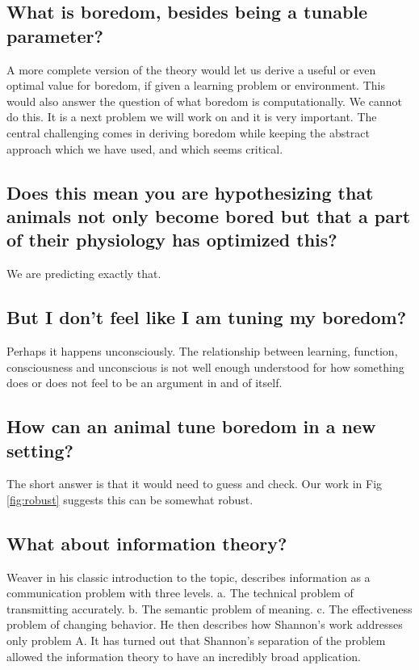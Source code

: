 \subsection*{What is boredom, besides being a tunable parameter?}
A more complete version of the theory would let us derive a useful or even optimal value for boredom, if given a learning problem or environment. This would also answer the question of what boredom is computationally. We cannot do this. It is a next problem we will work on and it is very important. The central challenging comes in deriving boredom while keeping the abstract approach which we have used, and which seems critical.


\subsection*{Does this mean you are hypothesizing that animals not only become bored but that a part of their physiology has optimized this?}
We are predicting exactly that.


\subsection*{But I don't feel like I am tuning my boredom?}
Perhaps it happens unconsciously. The relationship between learning, function, consciousness and unconscious is not well enough understood for how something does or does not feel to be an argument in and of itself.


\subsection*{How can an animal tune boredom in a new setting?}
The short answer is that it would need to guess and check. Our work in Fig \ref{fig:robust} suggests this can be somewhat robust.


\subsection*{What about information theory?}
Weaver \cite{Shannon1948} in his classic introduction to the topic, describes information as a communication problem with three levels. a. The technical problem of transmitting accurately. b. The semantic problem of meaning. c. The effectiveness problem of changing behavior. He then describes how Shannon's work addresses only problem A. It has turned out that Shannon's separation of the problem allowed the information theory to have an incredibly broad application. 

